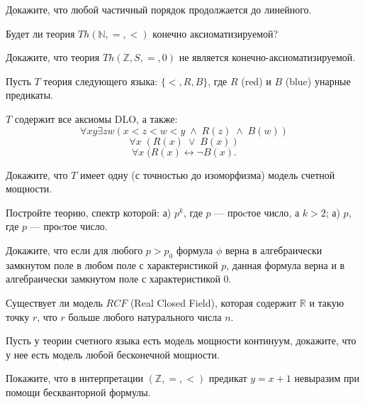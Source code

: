\setcounter{curtask}{1}

\begin{task}
    Докажите, что любой частичный порядок продолжается до линейного.
\end{task}

\begin{task}
    Будет ли теория $Th(\mathbb{N}, =, <)$ конечно аксиоматизируемой?
\end{task}

\begin{task}
    Докажите, что теория $Th(\mathbb{Z}, S, =, 0)$ не является
    конечно-аксиоматизируемой.
\end{task}

\begin{task}
    Пусть $T$ теория следующего языка: $\{<, R, B\}$, где $R$ (red) и $B$ (blue)
    унарные предикаты.
    
	$T$ содержит все аксиомы DLO, а также: 
	\[ \forall xy \exists zw (x < z < w < y \; \wedge \; R(z) \; \wedge \; B(w)) \]
	\[ \forall x \; (R(x)\; \vee \; B(x)) \]
	\[ \forall x \; (R(x) \leftrightarrow \neg B(x). \]
    
	Докажите, что $T$ имеет одну (с точностью до изоморфизма) модель счетной
    мощности.
\end{task}


\begin{task}
    Постройте теорию, спектр которой:
    а) $p^k$, где $p$ --- проcтое число, а $k > 2$;
    а) $p$, где $p$ --- проcтое число.
\end{task}

\begin{task}
    Докажите, что если для любого $p > p_0$ формула $\phi$ верна в алгебраически
    замкнутом поле в любом поле с характеристикой $p$, данная формула верна и в
    алгебраически замкнутом поле с характеристикой 0.
\end{task}

\begin{task}
  	Существует ли модель $RCF$ (Real Closed Field), которая содержит $\mathbb{R}$ и
    такую точку $r$, что $r$ больше любого натурального числа $n$.
\end{task}

\begin{task}
    Пусть у теории счетного языка есть модель мощности континуум, докажите, что у нее есть модель любой 
    бесконечной мощности.
\end{task}

\begin{task}
    Покажите, что в интерпретации $(\mathbb{Z}, =, <)$ предикат $y = x
    + 1$ невыразим при помощи бескванторной формулы.
\end{task}